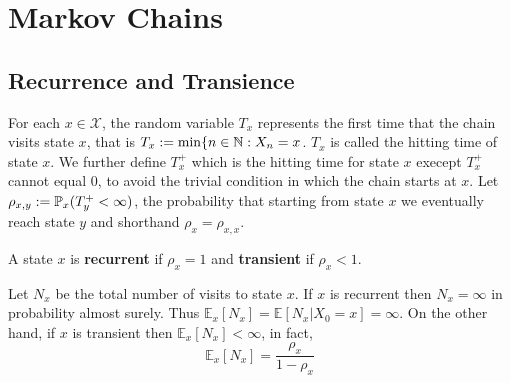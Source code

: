 \documentclass[11pt]{scrartcl}
\begin{document}
\section{Markov Chains}
\subsection{Recurrence and Transience}
For each $x\in \mathcal{X} $, the random variable $T_{x} $ represents the first
time that the chain visits state $x$, that is $T_{x}:= \min \{n\in \mathbb{N}: X_{n}
  = x $. $T_{x} $ is called the hitting time of state $x$. We further define
  $T_{x}^{+}  $ which is the hitting time for state $x$ execept $T_{x}^{+}
  $ cannot equal 0, to avoid the trivial condition in which the chain starts at
  $x$. 
  Let $\rho_{x,y}:=\mathbb{P}_x(T_{y}^{+} < \infty  )$, the probability that starting
  from state $x$ we eventually reach state $y$ and shorthand
  $\rho_{x}=\rho_{x,x}  $. 
  \begin{definition}
    A state $x$ is \textbf{recurrent}  if $\rho_{x}=1 $ and \textbf{transient}
  if $\rho_{x}<1 $.
  \end{definition}
  \begin{proposition}
    Let $N_{x} $ be the total number of visits to state $x$. If $x$ is
    recurrent then $N_{x}=\infty $ in probability almost surely. Thus
    $\mathbb{E}_{x} [N_{x} ] = \mathbb{E} [N_{x} | X_{0}=x  ] =\infty$. On
    the other hand, if $x$ is transient then $\mathbb{E}_{x} [N_{x}
    ] < \infty$, in fact, \[
      \mathbb{E}_{x} [N_{x} ]  = \frac{\rho_{x}}{1-\rho_{x}}
    \]  
  \end{proposition}
\end{document}
